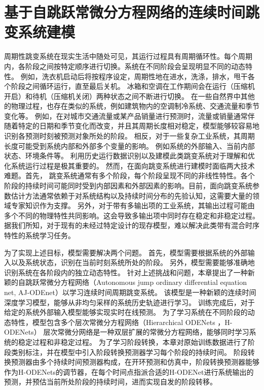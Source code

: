 

\chapter{基于自跳跃常微分方程网络的连续时间跳变系统建模}
周期性跳变系统在现实生活中随处可见，其运行过程具有周期循环性。每个周期内，各阶段之间按特定顺序进行切换。系统在不同阶段会呈现明显不同的动态特性。
例如，洗衣机启动后将按程序设定，周期性地在进水，洗涤，排水，甩干各个阶段之间循环运行，直至最后关机。
冰箱和空调在工作期间会在运行（压缩机开启）和待机（压缩机关闭）两种状态之间不断进行切换。
在一些自然界中其他的物理过程，也存在类似的系统，例如建筑物内的空调制冷系统、交通流量和季节变化等。
例如，在对城市交通流量或某产品销量进行预测时，流量或销量通常伴随着特定的日期和季节变化而改变，并且其周期长度相对稳定，模型能够较容易地识别各预测时刻被预测对象所处的阶段。
相反，对于一些复杂工业系统，其周期长度可能受到系统内部和外部多个变量的影响。
例如系统的外部输入、当前内部状态、环境条件等。
利用历史运行数据识别以及建模此类跳变系统对于理解和优化系统运行过程是极其重要的。
然而，在面向跳变系统进行建模时面临两大技术难题。首先，
跳变系统通常有多个阶段，每个阶段呈现不同的非线性特性。各个阶段的持续时间可能同时受到内部因素和外部因素的影响\cite{WANG2022111790}。目前，面向跳变系统参数估计方法\cite{balenzuela2022parameter}通常依赖于对系统结构以及持续时间分布的先验认知，这需要大量的领域专家知识作为支撑。
另外，对于带有多输出项的工业系统，其输出过程可能由
多个不同的物理特性共同影响。这会导致多输出项中同时存在稳定和非稳定过程\cite{nason2006stationary}。
据我们所知，对于现有的未经过特定设计的现存模型，难以解决此类带有混合时序特性的系统学习任务。

为了实现上述目标，模型需要解决两个问题。
首先，模型需要根据系统的外部输入以及系统状态，识别在当前时刻系统所处的阶段。
另外，模型需要能够准确地识别系统在各阶段内的独立动态特性。
针对上述挑战和问题，本章提出了一种新颖的自跳跃常微分方程网络（Autonomous jump ordinary differential equation net, AJ-ODEnet）以学习连续时间周期跳变系统。
该模型是一种新颖的连续时间深度学习模型，能够从非均匀采样的系统历史轨迹进行学习。
训练完成后，对于给定的系统外部输入模型能够实现实时在线预测。
为了学习系统在不同阶段的动态特性，模型包含多个层次常微分方程网络（Hierarchical ODENets ，H-ODENets）
层次常微分网络是一种双层扩展的常微分方程网络，能够同时学习系统的稳定过程和非稳定过程。
为了学习阶段转换，本章对原始训练数据进行了阶段类别标注，并在模型中引入阶段转换预测器学习每个阶段的持续时间。
阶段转换预测器由多个持续时间预测器构成，在开环预测和仿真中，阶段转换预测器能够作为H-ODENets的调节器，在每个时间点指派合适的H-ODENet进行系统输出的预测，并预估当前所处阶段的持续时间，进而实现自发的阶段转移。

